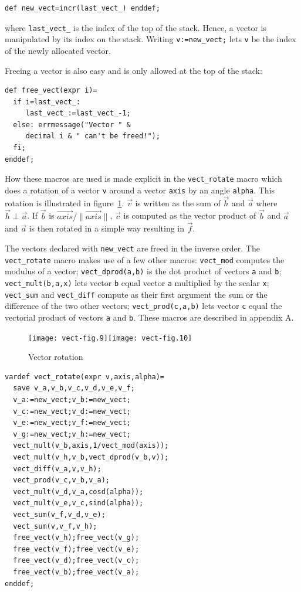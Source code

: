 \documentclass[nonumber,harvardcite]{ltugboat}
\begin{document}
\begin{verbatim}
def new_vect=incr(last_vect_) enddef;
\end{verbatim}

\noindent where \verb|last_vect_| is the index of the top of the stack.
Hence, a vector is manipulated by its index on the stack. 
Writing \verb|v:=new_vect;| lets \verb|v| be the index of the newly allocated
vector. 

Freeing a vector is also easy and is only allowed at the top of the stack:

\begin{verbatim}
def free_vect(expr i)=
  if i=last_vect_: 
     last_vect_:=last_vect_-1;
  else: errmessage("Vector " & 
     decimal i & " can't be freed!");
  fi;
enddef;
\end{verbatim}

How these macros are used is made explicit in the \verb|vect_rotate| macro
which does a rotation of a vector \verb|v| around a vector \verb|axis|
by an angle \verb|alpha|. This rotation is illustrated 
in figure~\ref{vector-rotation}.
$\vec{v}$ is written as the sum of $\vec{h}$ and $\vec{a}$ where
$\vec{h} \perp \vec{a}$. If $\vec{b}$ is 
$\overrightarrow{axis}/{\|\overrightarrow{axis}\|}$, $\vec{c}$ is computed
as the vector product of $\vec{b}$ and $\vec{a}$ and $\vec{a}$ is then
rotated in a simple way resulting in $\vec{f}$.

The vectors declared with \verb|new_vect| are freed in the inverse order.
The \verb|vect_rotate| macro makes use of a few other macros:
\verb|vect_mod| computes the modulus of a vector; \verb|vect_dprod(a,b)| is 
the dot product of vectors \texttt{a} and \texttt{b}; \verb|vect_mult(b,a,x)|
lets vector \texttt{b} equal vector \texttt{a} multiplied by the scalar 
\texttt{x}; \verb|vect_sum| and \verb|vect_diff| compute as their first
argument the sum or the difference of the two other vectors; 
\verb|vect_prod(c,a,b)| lets vector \texttt{c} equal the vectorial
product of vectors \texttt{a} and \texttt{b}. These macros are
described in appendix A.

\begin{figure}
\begin{center}
\texttt{[image: vect-fig.9]}\hspace{1cm}\texttt{[image: vect-fig.10]}
\end{center}
\caption{Vector rotation}\label{vector-rotation}
\end{figure}

\begin{verbatim}
vardef vect_rotate(expr v,axis,alpha)=
  save v_a,v_b,v_c,v_d,v_e,v_f;
  v_a:=new_vect;v_b:=new_vect;
  v_c:=new_vect;v_d:=new_vect;
  v_e:=new_vect;v_f:=new_vect;
  v_g:=new_vect;v_h:=new_vect;
  vect_mult(v_b,axis,1/vect_mod(axis));
  vect_mult(v_h,v_b,vect_dprod(v_b,v)); 
  vect_diff(v_a,v,v_h);
  vect_prod(v_c,v_b,v_a);
  vect_mult(v_d,v_a,cosd(alpha));
  vect_mult(v_e,v_c,sind(alpha));
  vect_sum(v_f,v_d,v_e);
  vect_sum(v,v_f,v_h);
  free_vect(v_h);free_vect(v_g);
  free_vect(v_f);free_vect(v_e);
  free_vect(v_d);free_vect(v_c);
  free_vect(v_b);free_vect(v_a);
enddef;
\end{verbatim}
\end{document}
